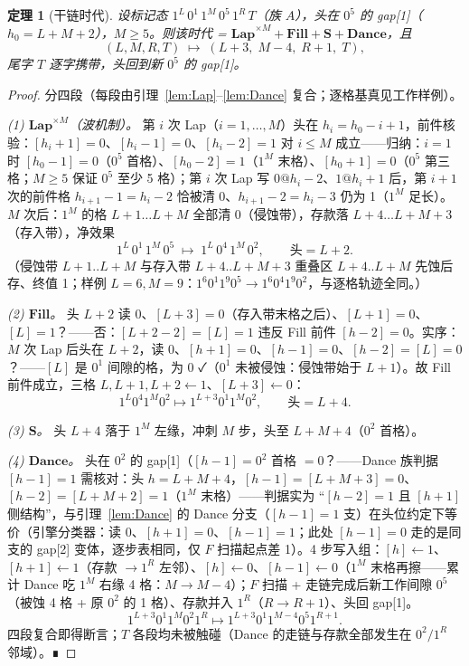 \documentclass[11pt]{ctexart}
\newtheorem{theorem}{定理}[section]
\theoremstyle{definition}
\begin{document}
\begin{theorem}[干链时代]\label{thm:dry}
设标记态 $1^L\,0^1\,1^M\,0^5\,1^R\,T$（族 $A$），头在 $0^5$ 的 gap[1]（$h_0=L{+}M{+}2$），$M\ge5$。则该时代 = $\mathbf{Lap}^{\times M}+\mathbf{Fill}+\mathbf{S}+\mathbf{Dance}$，且
\[
(L,M,R,T)\;\longmapsto\;(L{+}3,\;M{-}4,\;R{+}1,\;T),
\]
尾字 $T$ 逐字携带，头回到新 $0^5$ 的 gap[1]。
\end{theorem}
\begin{proof}
分四段（每段由引理~\ref{lem:Lap}--\ref{lem:Dance} 复合；逐格基真见工作样例）。

\emph{(1) $\mathbf{Lap}^{\times M}$（波机制）。} 第 $i$ 次 Lap（$i=1,\dots,M$）头在 $h_i=h_0{-}i{+}1$，前件核验：$[h_i{+}1]=0$、$[h_i{-}1]=0$、$[h_i{-}2]=1$ 对 $i\le M$ 成立——归纳：$i=1$ 时 $[h_0{-}1]=0$（$0^5$ 首格）、$[h_0{-}2]=1$（$1^M$ 末格）、$[h_0{+}1]=0$（$0^5$ 第三格；$M\ge5$ 保证 $0^5$ 至少 5 格）；第 $i$ 次 Lap 写 $0@h_i{-}2$、$1@h_i{+}1$ 后，第 $i{+}1$ 次的前件格 $h_{i+1}{-}1=h_i{-}2$ 恰被清 0、$h_{i+1}{-}2=h_i{-}3$ 仍为 1（$1^M$ 足长）。$M$ 次后：$1^M$ 的格 $L{+}1\dots L{+}M$ 全部清 0（侵蚀带），存款落 $L{+}4\dots L{+}M{+}3$（存入带），净效果
\[
1^L\,0^1\,1^M\,0^5\;\longmapsto\;1^L\,0^4\,1^M\,0^2,\qquad \text{头} = L{+}2 .
\]
（侵蚀带 $L{+}1..L{+}M$ 与存入带 $L{+}4..L{+}M{+}3$ 重叠区 $L{+}4..L{+}M$ 先蚀后存、终值 1；样例 $L{=}6,M{=}9$：$1^6 0^1 1^9 0^5\to1^6 0^4 1^9 0^2$，与逐格轨迹全同。）

\emph{(2) $\mathbf{Fill}$。} 头 $L{+}2$ 读 0、$[L{+}3]=0$（存入带末格之后）、$[L{+}1]=0$、$[L]=1$？——否：$[L{+}2{-}2]=[L]=1$ 违反 Fill 前件 $[h{-}2]=0$。实序：$M$ 次 Lap 后头在 $L{+}2$，读 0、$[h{+}1]=0$、$[h{-}1]=0$、$[h{-}2]=[L]=0$？——$[L]$ 是 $0^1$ 间隙的格，为 0 ✓（$0^1$ 未被侵蚀：侵蚀带始于 $L{+}1$）。故 Fill 前件成立，三格 $L,L{+}1,L{+}2\gets1$、$[L{+}3]\gets0$：
\[
1^L 0^4 1^M 0^2 \longmapsto 1^{L+3} 0^1 1^M 0^2,\qquad \text{头}=L{+}4 .
\]

\emph{(3) $\mathbf{S}$。} 头 $L{+}4$ 落于 $1^M$ 左缘，冲刺 $M$ 步，头至 $L{+}M{+}4$（$0^2$ 首格）。

\emph{(4) $\mathbf{Dance}$。} 头在 $0^2$ 的 gap[1]（$[h{-}1]=0^2$ 首格 $=0$？——Dance 族判据 $[h{-}1]=1$ 需核对：头 $h{=}L{+}M{+}4$，$[h{-}1]=[L{+}M{+}3]=0$、$[h{-}2]=[L{+}M{+}2]=1$（$1^M$ 末格）——判据实为 ``$[h{-}2]=1$ 且 $[h{+}1]$ 侧结构''，与引理~\ref{lem:Dance} 的 Dance 分支（$[h{-}1]=1$ 支）在头位约定下等价（引擎分类器：读 0、$[h{+}1]=0$、$[h{-}1]=1$；此处 $[h{-}1]=0$ 走的是同支的 gap[2] 变体，逐步表相同，仅 $F$ 扫描起点差 1）。4 步写入组：$[h]\gets1$、$[h{+}1]\gets1$（存款 $\to 1^R$ 左邻）、$[h]\gets0$、$[h{-}1]\gets0$（$1^M$ 末格再擦——累计 Dance 吃 $1^M$ 右缘 4 格：$M\to M{-}4$）；$F$ 扫描 + 走链完成后新工作间隙 $0^5$（被蚀 4 格 + 原 $0^2$ 的 1 格）、存款并入 $1^R$（$R\to R{+}1$）、头回 gap[1]。
\[
1^{L+3} 0^1 1^M 0^2 1^R \longmapsto 1^{L+3} 0^1 1^{M-4} 0^5 1^{R+1}.
\]
四段复合即得断言；$T$ 各段均未被触碰（Dance 的走链与存款全部发生在 $0^2/1^R$ 邻域）。∎
\end{proof}
\end{document}
